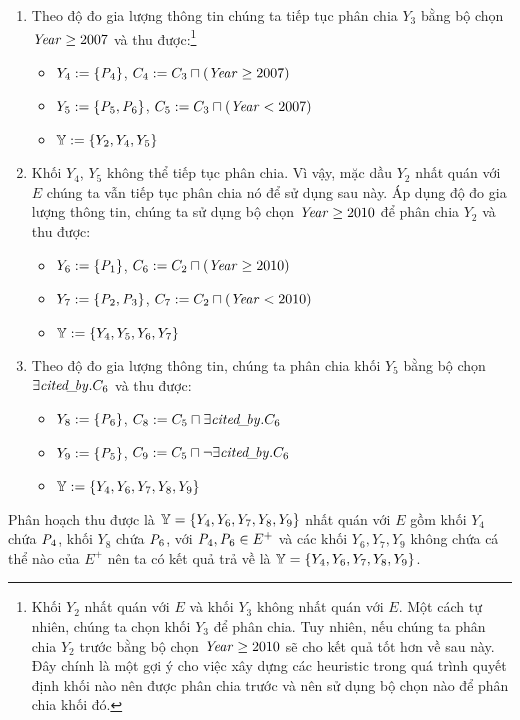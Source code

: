 \begin{Example}
\begin{enumerate}
	\item  Theo độ đo gia lượng thông tin chúng ta tiếp tục phân chia $Y_3$ bằng bộ chọn $\mathit{Year} \geq 2007$ và thu được:\footnote{Khối $Y_2$ nhất quán với $E$ và khối $Y_3$ không nhất quán với $E$. Một cách tự nhiên, chúng ta chọn khối $Y_3$ để phân chia. Tuy nhiên, nếu chúng ta phân chia $Y_2$ trước bằng bộ chọn $\mathit{Year} \geq 2010$ sẽ cho kết quả tốt hơn về sau này. Đây chính là một gợi ý cho việc xây dựng các heuristic trong quá trình quyết định khối nào nên được phân chia trước và nên sử dụng bộ chọn nào để phân chia khối đó.}
	\begin{itemize}
		\item $Y_4 := \{\mathit{P}_4\}$, $C_4 := C_3 \sqcap (\mathit{Year} \geq 2007)$
		\item $Y_5 := \{\mathit{P}_5, \mathit{P}_6\}$, $C_5 := C_3 \sqcap (\mathit{Year} < 2007)$
		\item $\mathbb{Y} := \{Y_2, Y_4, Y_5\}$
	\end{itemize}
	\item Khối $Y_4$, $Y_5$ không thể tiếp tục phân chia. Vì vậy, mặc dầu $Y_2$ nhất quán với $E$ chúng ta vẫn tiếp tục phân chia nó để sử dụng sau này. Áp dụng độ đo gia lượng thông tin, chúng ta sử dụng bộ chọn $\mathit{Year} \geq 2010$ để phân chia $Y_2$ và thu được:
	\begin{itemize}
		\item $Y_6 := \{\mathit{P}_1\}$, $C_6 := C_2 \sqcap (\mathit{Year} \geq 2010)$
		\item $Y_7 := \{\mathit{P}_2, \mathit{P}_3\}$, $C_7 := C_2 \sqcap (\mathit{Year} < 2010)$
		\item $\mathbb{Y} := \{Y_4, Y_5, Y_6, Y_7\}$
	\end{itemize}
	\item Theo độ đo gia lượng thông tin, chúng ta phân chia khối $Y_5$ bằng bộ chọn $\exists\mathit{cited\!\_\!by}.C_6$ và thu được:
	\begin{itemize}
		\item $Y_8 := \{\mathit{P}_6\}$, $C_8 := C_5 \sqcap \exists\mathit{cited\!\_\!by}.C_6$
		\item $Y_9 := \{\mathit{P}_5\}$, $C_9 := C_5 \sqcap \neg\exists\mathit{cited\!\_\!by}.C_6$
		\item $\mathbb{Y} := \{Y_4, Y_6, Y_7, Y_8, Y_9\}$
	\end{itemize}
\end{enumerate}

Phân hoạch thu được là $\mathbb{Y} = \{Y_4, Y_6, Y_7, Y_8, Y_9\}$ nhất quán với $E$ gồm khối $Y_4$ chứa $\mathit{P}_4$, khối $Y_8$ chứa $\mathit{P}_6$, với $\mathit{P}_4, \mathit{P}_6 \in E^+$ và các khối $Y_6, Y_7, Y_9$ không chứa cá thể nào của $E^+$ nên ta có kết quả trả về là $\mathbb{Y} = \{Y_4, Y_6, Y_7, Y_8, Y_9\}$.\myend
\end{Example}

